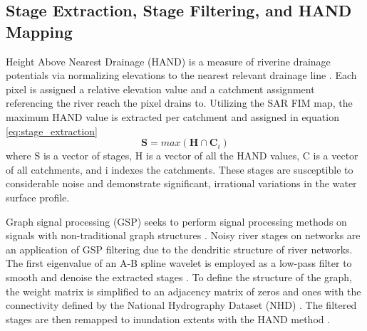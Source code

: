 \documentclass{article}
\begin{document}
\subsection{Stage Extraction, Stage Filtering, and HAND Mapping}
\label{ssec:stage_extraction_filter_mapping}
%
Height Above Nearest Drainage (HAND) is a measure of riverine drainage potentials via normalizing elevations to the nearest relevant drainage line \cite{renno2008hand,nobre2011height,nobre2016hand,aristizabal2020cahaba}. 
Each pixel is assigned a relative elevation value and a catchment assignment referencing the river reach the pixel drains to.
Utilizing the SAR FIM map, the maximum HAND value is extracted per catchment and assigned in equation \ref{eq:stage_extraction} 
%
\begin{equation}
\label{eq:stage_extraction}
\textbf{S} = max(\textbf{H} \cap \textbf{C}_i)
\end{equation}
%
where S is a vector of stages, H is a vector of all the HAND values, C is a vector of all catchments, and i indexes the catchments.
These stages are susceptible to considerable noise and demonstrate significant, irrational variations in the water surface profile. 

Graph signal processing (GSP) seeks to perform signal processing methods on signals with non-traditional graph structures \cite{gavili2017shift,defferrard2017pygsp,ortega2018graph,chen2014signal}. 
Noisy river stages on networks are an application of GSP filtering due to the dendritic structure of river networks.
The first eigenvalue of an A-B spline wavelet is employed as a low-pass filter to smooth and denoise the extracted stages \cite{defferrard2017pygsp}.
To define the structure of the graph, the weight matrix is simplified to an adjacency matrix of zeros and ones with the connectivity defined by the National Hydrography Dataset (NHD) \cite{usgs2019national}.
The filtered stages are then remapped to inundation extents with the HAND method \cite{renno2008hand,nobre2011height,nobre2016hand,aristizabal2020cahaba}.   
%
\end{document}
